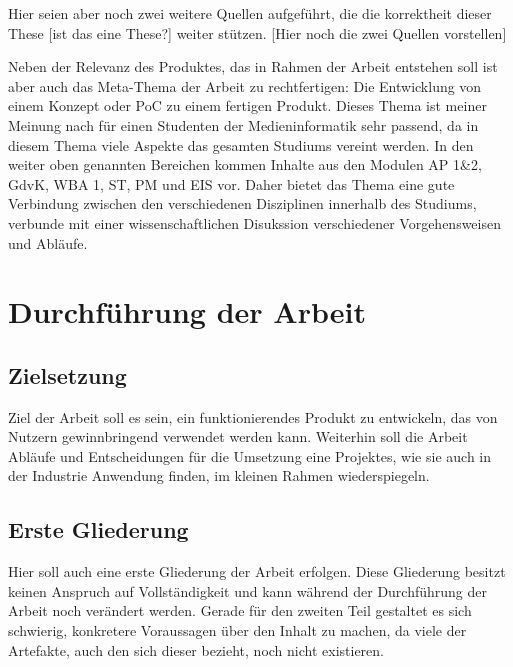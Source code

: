 Hier seien aber noch zwei weitere Quellen aufgeführt, die die korrektheit dieser These [ist das eine These?] weiter stützen.
[Hier noch die zwei Quellen vorstellen]

Neben der Relevanz des Produktes, das in Rahmen der Arbeit entstehen soll ist aber auch das Meta-Thema der Arbeit zu rechtfertigen: Die Entwicklung von einem Konzept oder PoC zu einem fertigen Produkt.
Dieses Thema ist meiner Meinung nach für einen Studenten der Medieninformatik sehr passend, da in diesem Thema viele Aspekte das gesamten Studiums vereint werden. In den weiter oben genannten Bereichen kommen Inhalte aus den Modulen AP 1\&2, GdvK, WBA 1, ST,  PM und EIS vor. Daher bietet das Thema eine gute Verbindung zwischen den verschiedenen Disziplinen innerhalb des Studiums, verbunde mit einer wissenschaftlichen Disukssion verschiedener Vorgehensweisen und Abläufe.

\section{Durchführung der Arbeit}
\subsection{Zielsetzung}
Ziel der Arbeit soll es sein, ein funktionierendes Produkt zu entwickeln, das von Nutzern gewinnbringend verwendet werden kann.
Weiterhin soll die Arbeit Abläufe und Entscheidungen für die Umsetzung eine Projektes, wie sie auch in der Industrie Anwendung finden, im kleinen Rahmen wiederspiegeln.

\subsection{Erste Gliederung}
Hier soll auch eine erste Gliederung der Arbeit erfolgen. Diese Gliederung besitzt keinen Anspruch auf Vollständigkeit und kann während der Durchführung der Arbeit noch verändert werden.
Gerade für den zweiten Teil gestaltet es sich schwierig, konkretere Voraussagen über den Inhalt zu machen, da viele der Artefakte, auch den sich dieser bezieht, noch nicht existieren.

